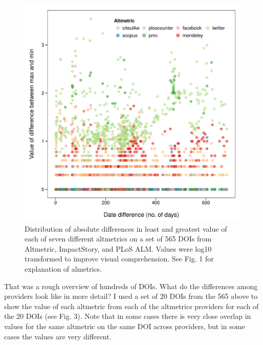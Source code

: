 \documentclass[letterpaper,superscriptaddress,showkeys,longbibliography]{revtex4-1}\usepackage{graphicx, color}
\newenvironment{knitrout}{}{} %
\begin{document}
\begin{knitrout}
\color{fgcolor}\begin{figure}[]


{\centering \includegraphics[width=.7\linewidth]{figure/dataconst_plot2} 

}

\caption[Distribution of absolute differences in least and greatest value of each of seven different altmetrics on a set of 565 DOIs from Altmetric, ImpactStory, and PLoS ALM]{Distribution of absolute differences in least and greatest value of each of seven different altmetrics on a set of 565 DOIs from Altmetric, ImpactStory, and PLoS ALM. Values were log10 transformed to improve visual comprehension. See Fig. 1 for explanation of almetrics.\label{fig:dataconst_plot2}}
\end{figure}


\end{knitrout}


That was a rough overview of hundreds of DOIs. What do the differences among providers look like in more detail? I used a set of 20 DOIs from the 565 above to show the value of each altmetric from each of the altmetrics providers for each of the 20 DOIs (see Fig. 3). Note that in some cases there is very close overlap in values for the same altmetric on the same DOI across providers, but in some cases the values are very different. 
\end{document}
